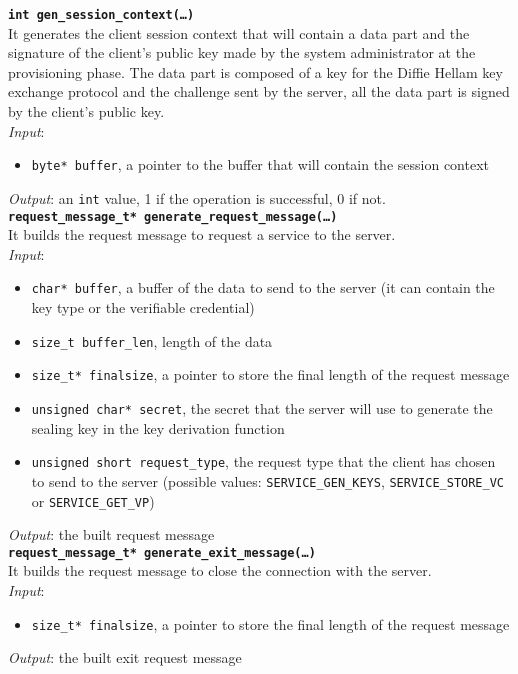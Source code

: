 \noindent
\texttt{\bfseries int gen\_session\_context(\dots)}\\
It generates the client session context that will contain a data part and the signature of the client's public key made by the system administrator at the provisioning phase. The data part is composed of a key for the Diffie Hellam key exchange protocol and the challenge sent by the server, all the data part is signed by the client's public key. \\
\textit{Input}:
\begin{itemize}[noitemsep,nolistsep]
  \item \texttt{byte* buffer}, a pointer to the buffer that will contain the session context
\end{itemize}
\textit{Output}: an \texttt{int} value, 1 if the operation is successful, 0 if not. \\


\noindent
\texttt{\bfseries request\_message\_t* generate\_request\_message(\dots)}\\
It builds the request message to request a service to the server. \\
\textit{Input}:
\begin{itemize}[noitemsep,nolistsep]
  \item \texttt{char* buffer}, a buffer of the data to send to the server (it can contain the key type or the verifiable credential)
  \item \texttt{size\_t buffer\_len}, length of the data
  \item \texttt{size\_t* finalsize}, a pointer to store the final length of the request message
  \item \texttt{unsigned char* secret}, the secret that the server will use to generate the sealing key in the key derivation function
  \item \texttt{unsigned short request\_type}, the request type that the client has chosen to send to the server (possible values: \texttt{SERVICE\_GEN\_KEYS}, \texttt{SERVICE\_STORE\_VC} or \texttt{SERVICE\_GET\_VP})
\end{itemize}
\textit{Output}: the built request message \\

\noindent
\texttt{\bfseries request\_message\_t* generate\_exit\_message(\dots)}\\
It builds the request message to close the connection with the server. \\
\textit{Input}:
\begin{itemize}[noitemsep,nolistsep]
  \item \texttt{size\_t* finalsize}, a pointer to store the final length of the request message
\end{itemize}
\textit{Output}: the built exit request message


